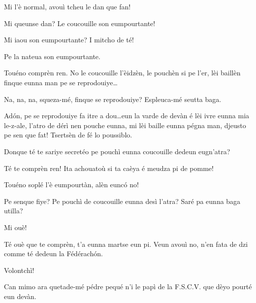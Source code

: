 \begin{drama}
\Tuenospeaks Mi l'è normal, avouì tcheu le dan que fan!

\Richardspeaks Mi queunse dan? Le coucouille son eumpourtante! 

\Tuenospeaks Mi iaou son eumpourtante? I mitcho de té!

\Gerominespeaks Pe la nateua son eumpourtante.

\Richardspeaks{} Touéno comprèn ren. No le coucouille l'èi\-dzèn, le pouchèn si pe l'er, lèi baillèn finque eunna man pe se reprodouiye\ldots

\Tuenospeaks{} Na, na, na, squeza-mé, finque se reprodouiye? Es\-pleu\-ca-mé seutta baga.

\Richardspeaks Ad\'on, pe se reprodouiye fa itre a dou\ldots eun la varde de devàn é lèi ivre eunna mia le-z-ale, l'atro de dérì nen pouche eunna, mi lèi baille eunna pégna man, djeusto pe sen que fat! Tsertsèn de fé lo poussiblo.

\Tuenospeaks Donque té te sariye secretéo pe pouchì eunna coucouille dedeun eugn'atra?

\Richardspeaks Té te comprèn ren! Ita achouatoù si ta caèya é meudza pi de pomme!

\Gerominespeaks Touéno soplé l'è eumpourtàn, alèn eunc\'o no!

\Tuenospeaks Pe senque fiye? Pe pouchì de coucouille eunna desì l'atra? Saré pa eunna baga utilla?

\Gerominespeaks Mi ouè!

\Richardspeaks{} Té ouè que te comprèn, t'a eunna martse eun pi. Veun avouì no, n'en fata de dzi comme té dedeun la Fédérach\'on.

\Gerominespeaks Volontchì!


\Richardspeaks Can mimo ara quetade-mé pédre pequé n'i le papì de la F.S.C.V. que dèyo pourté eun devàn.

\newpage
{}





\end{drama}
